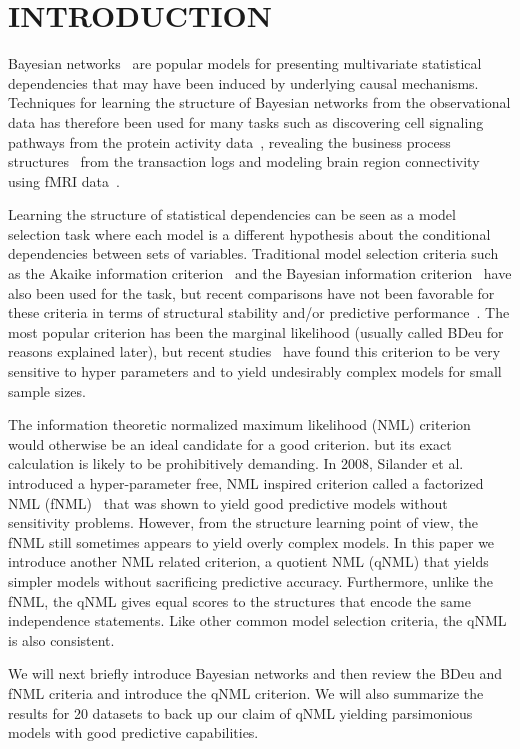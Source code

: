 \section{INTRODUCTION}
\label{sec:intro}
Bayesian networks~\cite{Pear88} are popular models for presenting
multivariate statistical dependencies that may have been induced by
underlying causal mechanisms.  Techniques for learning the structure
of Bayesian networks from the observational data has therefore been
used for many tasks such as discovering cell signaling pathways from
the protein activity data~\cite{bn4sigpath02}, revealing the business
process structures~\cite{bn4bpmining} from the transaction logs and
modeling brain region connectivity using fMRI
data~\cite{bn4brainconnect}.

Learning the structure of statistical dependencies can be seen as a
model selection task where each model is a different hypothesis about
the conditional dependencies between sets of variables. Traditional
model selection criteria such as the Akaike information
criterion~\cite{Akai73} and the Bayesian information
criterion~\cite{Schw78} have also been used for the task, but recent
comparisons have not been favorable for these criteria in terms of
structural stability and/or predictive
performance~\cite{cosco.pgm08a}.  The most popular criterion has been
the marginal likelihood (usually called BDeu for reasons explained
later), but recent studies~\cite{cosco.uai07,Steck08} have found this
criterion to be very sensitive to hyper parameters and to yield
undesirably complex models for small sample sizes.

The information theoretic normalized maximum likelihood (NML)
criterion~\cite{Shta87,Riss96a} would otherwise be an ideal candidate
for a good criterion.  but its exact calculation is likely to be
prohibitively demanding. In 2008, Silander et al. introduced a
hyper-parameter free, NML inspired criterion called a factorized NML
(fNML)~\cite{cosco.pgm08a} that was shown to yield good predictive
models without sensitivity problems.  However, from the structure
learning point of view, the fNML still sometimes appears to yield
overly complex models. In this paper we introduce another NML related
criterion, a quotient NML (qNML) that yields simpler models without
sacrificing predictive accuracy. Furthermore, unlike the fNML, the
qNML gives equal scores to the structures that encode the same
independence statements. Like other common model selection criteria,
the qNML is also consistent.

We will next briefly introduce Bayesian networks and then review the
BDeu and fNML criteria and introduce the qNML criterion.  We will also
summarize the results for 20 datasets to back up our claim of qNML
yielding parsimonious models with good predictive capabilities.
